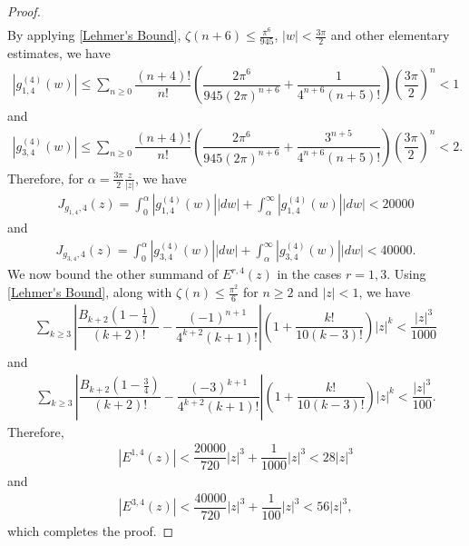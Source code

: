\documentclass[11pt,reqno]{amsart}
\theoremstyle{definition}
\theoremstyle{plain}
\theoremstyle{named}
\numberwithin{equation}{section}
\theoremstyle{example}
\def\lp{\left(}
\def\rp{\right)}
\begin{document}
\begin{proof}
\begin{align*}
\end{align*}
By applying \eqref{Lehmer's Bound}, $\zeta(n+6) \leq \frac{\pi^6}{945}$, $|w| < \frac{3\pi}{2}$ and other elementary estimates, we have
\begin{align*}
	\left| g^{(4)}_{1,4}(w) \right| \leq \sum_{n \geq 0} \dfrac{(n+4)!}{n!} \lp \dfrac{2\pi^6}{945 (2\pi)^{n+6}} + \dfrac{1}{4^{n+6} (n+5)!} \rp \lp \dfrac{3\pi}{2} \rp^n < 1
\end{align*}
and
\begin{align*}
	\left| g^{(4)}_{3,4}(w) \right| \leq \sum_{n \geq 0} \dfrac{(n+4)!}{n!} \lp \dfrac{2\pi^6}{945 (2\pi)^{n+6}} + \dfrac{3^{n+5}}{4^{n+6} (n+5)!} \rp \lp \dfrac{3\pi}{2} \rp^n < 2.
\end{align*}
Therefore, for $\alpha = \frac{3\pi}{2} \frac{z}{|z|}$, we have
\begin{align*}
	J_{g_{1,4},4}(z) = \int_0^\alpha \left| g^{(4)}_{1,4}(w) \right| |dw| + \int_\alpha^\infty \left| g^{(4)}_{1,4}(w) \right| |dw| < 20000
\end{align*}
and
\begin{align*}
	J_{g_{3,4},4}(z) = \int_0^\alpha \left| g^{(4)}_{3,4}(w) \right| |dw| + \int_\alpha^\infty \left| g^{(4)}_{3,4}(w) \right| |dw| < 40000.
\end{align*}
We now bound the other summand of $E^{r,4}(z)$ in the cases $r = 1,3$. Using \eqref{Lehmer's Bound}, along with $\zeta(n) \leq \frac{\pi^2}{6}$ for $n \geq 2$ and $|z| < 1$, we have
\begin{align*}
    \sum_{k \geq 3} \left| \dfrac{B_{k+2}\lp 1 - \frac 14 \rp}{(k+2)!} - \dfrac{(-1)^{n+1}}{4^{k+2} (k+1)!} \right| \lp 1 + \dfrac{k!}{10(k-3)!} \rp |z|^k < \dfrac{|z|^3}{1000}
\end{align*}
and
\begin{align*}
	\sum_{k \geq 3} \left| \dfrac{B_{k+2}\lp 1 - \frac 34 \rp}{(k+2)!} - \dfrac{(-3)^{k+1}}{4^{k+2} (k+1)!} \right| \lp 1 + \dfrac{k!}{10(k-3)!} \rp |z|^k < \dfrac{|z|^3}{100}.
\end{align*}
Therefore,
\begin{align*}
    \left| E^{1,4}(z) \right| < \dfrac{20000}{720} |z|^3 + \dfrac{1}{1000} |z|^3 < 28 |z|^3
\end{align*}
and
\begin{align*}
    \left| E^{3,4}(z) \right| < \dfrac{40000}{720} |z|^3 + \dfrac{1}{100} |z|^3 < 56 |z|^3,
\end{align*}
which completes the proof.
\end{proof}
\end{document}
